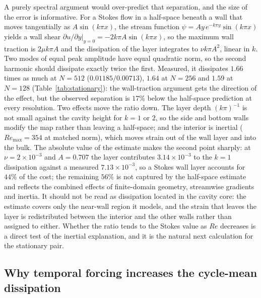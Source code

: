 \documentclass[11pt,a4paper]{article}
\begin{document}
A purely spectral argument would over-predict that separation, and the size of the
error is informative. For a Stokes flow in a half-space beneath a wall that moves
tangentially as $A\sin(k\pi x)$, the stream function $\psi=Ay\,e^{-k\pi y}\sin(k\pi x)$
yields a wall shear $\left.\partial u/\partial y\right|_{y=0}=-2k\pi A\sin(k\pi x)$,
so the maximum wall traction is $2\mu k\pi A$ and the dissipation of the layer
integrates to $\nu k\pi A^2$, linear in $k$. Two modes of equal peak amplitude have
equal quadratic norm, so the second harmonic should dissipate exactly twice the first.
Measured, it dissipates $1.66$ times as much at $N=512$ ($0.01185/0.00713$), $1.64$
at $N=256$ and $1.59$ at $N=128$ (Table~\ref{tab:stationary}): the wall-traction
argument gets the direction of the effect, but the observed separation is $17\%$
below the half-space prediction at every resolution. Two effects move the ratio down.
The layer depth $(k\pi)^{-1}$ is not small against the cavity height for $k=1$ or
$2$, so the side and bottom walls modify the map rather than leaving a half-space;
and the interior is inertial ($Re_{\max}=354$ at matched norm), which moves strain
out of the wall layer and into the bulk. The absolute value of the estimate makes
the second point sharply: at $\nu=2\times10^{-3}$ and $A=0.707$ the layer contributes
$3.14\times10^{-3}$ to the $k=1$ dissipation against a measured $7.13\times10^{-3}$,
so a Stokes wall layer accounts for $44\%$ of the cost; the remaining $56\%$ is not
captured by the half-space estimate and reflects the combined effects of
finite-domain geometry, streamwise gradients and inertia. It should not be read as
dissipation located in the cavity core: the estimate covers only the near-wall
region it models, and the strain that leaves the layer is redistributed between the
interior and the other walls rather than assigned to either. Whether the ratio tends
to the Stokes value as $Re$ decreases is a direct test of the inertial explanation,
and it is the natural next calculation for the stationary pair.

\subsection{Why temporal forcing increases the cycle-mean dissipation}
\end{document}

